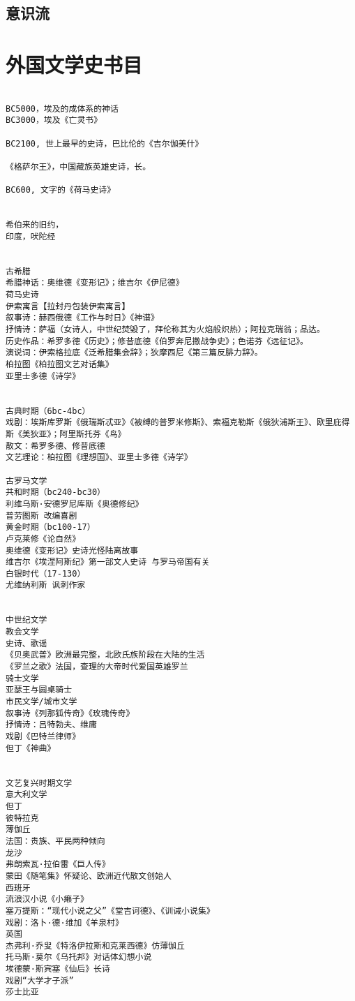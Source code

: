 \documentclass[UTF8]{../RepresentationUniverse}
\begin{document}
\section{意识流}




\chapter{外国文学史书目}

\begin{lstlisting}

BC5000，埃及的成体系的神话
BC3000，埃及《亡灵书》

BC2100, 世上最早的史诗，巴比伦的《吉尔伽美什》

《格萨尔王》，中国藏族英雄史诗，长。

BC600, 文字的《荷马史诗》


希伯来的旧约，
印度，吠陀经


古希腊
希腊神话：奥维德《变形记》；维吉尔《伊尼德》
荷马史诗
伊索寓言【拉封丹包装伊索寓言】
叙事诗：赫西俄德《工作与时日》《神谱》
抒情诗：萨福（女诗人，中世纪焚毁了，拜伦称其为火焰般炽热）；阿拉克瑞翁；品达。
历史作品：希罗多德《历史》；修昔底德《伯罗奔尼撒战争史》；色诺芬《远征记》。
演说词：伊索格拉底《泛希腊集会辞》；狄摩西尼《第三篇反腓力辞》。
柏拉图《柏拉图文艺对话集》
亚里士多德《诗学》


古典时期（6bc-4bc）
戏剧：埃斯库罗斯《俄瑞斯忒亚》《被缚的普罗米修斯》、索福克勒斯《俄狄浦斯王》、欧里庇得斯《美狄亚》；阿里斯托芬《鸟》
散文：希罗多德、修昔底德
文艺理论：柏拉图《理想国》、亚里士多德《诗学》

古罗马文学
共和时期（bc240-bc30）
利维乌斯·安德罗尼库斯《奥德修纪》
普劳图斯 改编喜剧
黄金时期（bc100-17）
卢克莱修《论自然》
奥维德《变形记》史诗光怪陆离故事
维吉尔《埃涅阿斯纪》第一部文人史诗 与罗马帝国有关
白银时代（17-130）
尤维纳利斯 讽刺作家


中世纪文学
教会文学
史诗、歌谣
《贝奥武普》欧洲最完整，北欧氏族阶段在大陆的生活
《罗兰之歌》法国，查理的大帝时代爱国英雄罗兰
骑士文学
亚瑟王与圆桌骑士
市民文学/城市文学
叙事诗《列那狐传奇》《玫瑰传奇》
抒情诗：吕特勃夫、维庸
戏剧《巴特兰律师》
但丁《神曲》


文艺复兴时期文学
意大利文学
但丁
彼特拉克
薄伽丘
法国：贵族、平民两种倾向
龙沙
弗朗索瓦·拉伯雷《巨人传》
蒙田《随笔集》怀疑论、欧洲近代散文创始人
西班牙
流浪汉小说《小癞子》
塞万提斯：“现代小说之父”《堂吉诃德》、《训诫小说集》
戏剧：洛卜·德·维加《羊泉村》
英国
杰弗利·乔叟《特洛伊拉斯和克莱西德》仿薄伽丘
托马斯·莫尔《乌托邦》对话体幻想小说
埃德蒙·斯宾塞《仙后》长诗
戏剧“大学才子派”
莎士比亚



\end{lstlisting}
\end{document}
